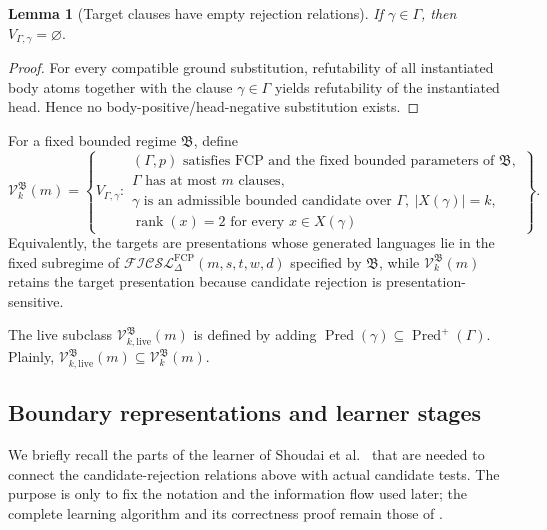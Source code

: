\documentclass[11pt]{article}
\newtheorem{lemma}[theorem]{Lemma}
\theoremstyle{definition}
\theoremstyle{remark}
\newcommand{\Pred}{\operatorname{Pred}}
\begin{document}
\begin{lemma}[Target clauses have empty rejection relations]
\label{lem:target-zero}
If \(\gamma\in\Gamma\), then
\(V_{\Gamma,\gamma}=\varnothing.\)
\end{lemma}

\begin{proof}
For every compatible ground substitution, refutability of all instantiated
body atoms together with the clause \(\gamma\in\Gamma\) yields refutability of
the instantiated head. Hence no body-positive/head-negative substitution
exists.
\end{proof}

For a fixed bounded regime \(\mathfrak B\), define
\[
\mathcal V_k^{\mathfrak B}(m)
=
\left\{
V_{\Gamma,\gamma}:
\begin{array}{l}
(\Gamma,p)\text{ satisfies FCP and the fixed bounded parameters of }\mathfrak B,\\
\Gamma\text{ has at most }m\text{ clauses},\\
\gamma\text{ is an admissible bounded candidate over }\Gamma,\ |X(\gamma)|=k,\\
\operatorname{rank}(x)=2\text{ for every }x\in X(\gamma)
\end{array}
\right\}.
\]
Equivalently, the targets are presentations whose generated languages lie in
the fixed subregime of
\(\mathcal{FICSL}^{\mathrm{FCP}}_{\Delta}(m,s,t,w,d)\)
specified by \(\mathfrak B\), while \(\mathcal V_k^{\mathfrak B}(m)\) retains
the target presentation because candidate rejection is presentation-sensitive.

The live subclass \(\mathcal V_{k,\mathrm{live}}^{\mathfrak B}(m)\) is defined
by adding \(\Pred(\gamma)\subseteq\Pred^+(\Gamma)\).  Plainly,
\(\mathcal V_{k,\mathrm{live}}^{\mathfrak B}(m) \subseteq \mathcal V_k^{\mathfrak B}(m).\)

\subsection{Boundary representations and learner stages}
\label{subsec:learner-machinery}

We briefly recall the parts of the learner of
Shoudai et al.~\cite{ShoudaiEtAl2026} that are needed to connect the
candidate-rejection relations above with actual candidate tests.  The purpose
is only to fix the notation and the information flow used later; the complete
learning algorithm and its correctness proof remain those of
\cite{ShoudaiEtAl2026}.
\end{document}
